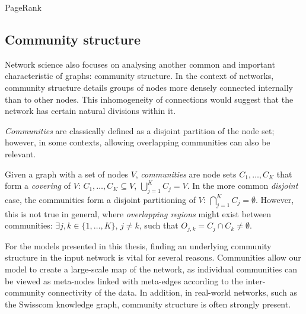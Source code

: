 \begin{algorithm}[H]
\caption{PageRank}
\label{algorithm:pagerank}
\begin{algorithmic}
\end{algorithmic}
\end{algorithm}

\subsection{Community structure}
Network science also focuses on analysing another common and important characteristic of graphs: community structure. In the context of networks, community structure details groups of nodes more densely connected internally than to other nodes. This inhomogeneity of connections would suggest that the network has certain natural divisions within it.

\emph{Communities} are classically defined as a disjoint partition of the node set; however, in some contexts, allowing overlapping communities can also be relevant.
\begin{definition}
Given a graph with a set of nodes $V$, \emph{communities} are node sets $C_1, \dots, C_K$ that form a \emph{covering} of $V$: $C_1, \dots, C_K \subseteq V$, $\bigcup_{j=1}^{K}{C_j} = V$. In the more common \emph{disjoint} case, the communities form a disjoint partitioning of $V$: $\bigcap_{j=1}^{K}{C_j}=\emptyset$. However, this is not true in general, where \emph{overlapping regions} might exist between communities: $\exists j,k \in \{1,\dots,K\}$, $j \neq k$, such that $O_{j,k} = C_j \cap C_k \neq \emptyset$.
\end{definition} 

For the models presented in this thesis, finding an underlying community structure in the input network is vital for several reasons. Communities allow our model to create a large-scale map of the network, as individual communities can be viewed as meta-nodes linked with meta-edges according to the inter-community connectivity of the data. In addition, in real-world networks, such as the Swisscom knowledge graph, community structure is often strongly present.

